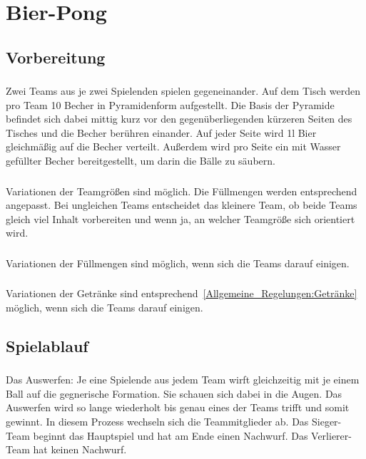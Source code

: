 \section{Bier-Pong}
\subsection{Vorbereitung}
\subsubsection{}
Zwei Teams aus je zwei Spielenden spielen gegeneinander.
Auf dem Tisch werden pro Team 10 Becher in Pyramidenform aufgestellt.
Die Basis der Pyramide befindet sich dabei mittig kurz vor den gegenüberliegenden kürzeren Seiten des Tisches und die Becher berühren einander.
Auf jeder Seite wird 1l Bier gleichmäßig auf die Becher verteilt.
Außerdem wird pro Seite ein mit Wasser gefüllter Becher bereitgestellt, um darin die Bälle zu säubern.

\subsubsection{}
Variationen der Teamgrößen sind möglich.
Die Füllmengen werden entsprechend angepasst.
Bei ungleichen Teams entscheidet das kleinere Team, ob beide Teams gleich viel Inhalt vorbereiten und wenn ja, an welcher Teamgröße sich orientiert wird.

\subsubsection{}
Variationen der Füllmengen sind möglich, wenn sich die Teams darauf einigen.

\subsubsection{}
Variationen der Getränke sind entsprechend~\ref{Allgemeine_Regelungen:Getränke} möglich, wenn sich die Teams darauf einigen.

\subsection{Spielablauf}\label{Bier-Pong:Spielablauf}
\subsubsection{}
Das Auswerfen: Je eine Spielende aus jedem Team wirft gleichzeitig mit je einem Ball auf die gegnerische Formation.
Sie schauen sich dabei in die Augen. Das Auswerfen wird so lange wiederholt bis genau eines der Teams trifft und somit gewinnt.
In diesem Prozess wechseln sich die Teammitglieder ab.
Das Sieger-Team beginnt das Hauptspiel und hat am Ende einen Nachwurf.
Das Verlierer-Team hat keinen Nachwurf.

